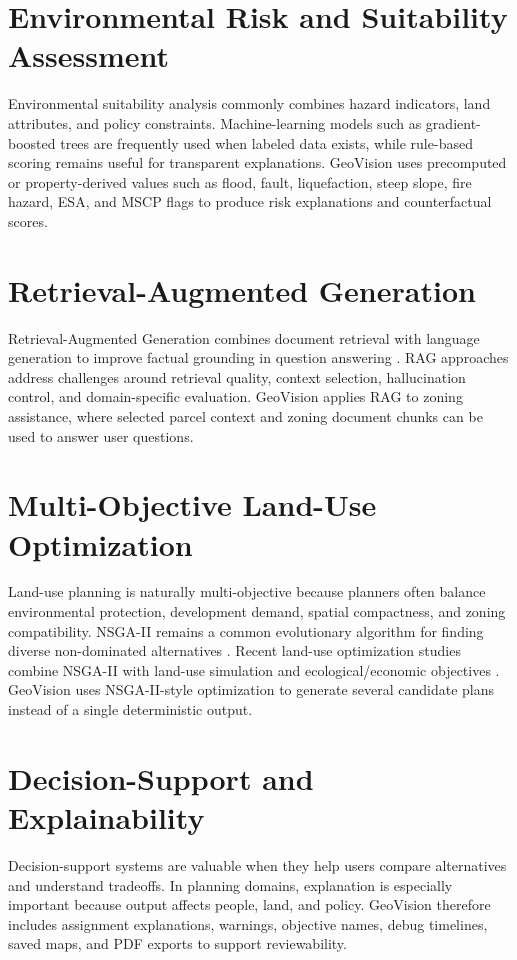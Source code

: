 \documentclass[12pt,a4paper,oneside]{report}
\begin{document}
\section{Environmental Risk and Suitability Assessment}
Environmental suitability analysis commonly combines hazard indicators, land attributes, and policy constraints. Machine-learning models such as gradient-boosted trees are frequently used when labeled data exists, while rule-based scoring remains useful for transparent explanations. GeoVision uses precomputed or property-derived values such as flood, fault, liquefaction, steep slope, fire hazard, ESA, and MSCP flags to produce risk explanations and counterfactual scores.

\section{Retrieval-Augmented Generation}
Retrieval-Augmented Generation combines document retrieval with language generation to improve factual grounding in question answering \cite{lewis2020rag}. RAG approaches address challenges around retrieval quality, context selection, hallucination control, and domain-specific evaluation. GeoVision applies RAG to zoning assistance, where selected parcel context and zoning document chunks can be used to answer user questions.

\section{Multi-Objective Land-Use Optimization}
Land-use planning is naturally multi-objective because planners often balance environmental protection, development demand, spatial compactness, and zoning compatibility. NSGA-II remains a common evolutionary algorithm for finding diverse non-dominated alternatives \cite{deb2002nsga}. Recent land-use optimization studies combine NSGA-II with land-use simulation and ecological/economic objectives \cite{luan2024landuse}. GeoVision uses NSGA-II-style optimization to generate several candidate plans instead of a single deterministic output.

\section{Decision-Support and Explainability}
Decision-support systems are valuable when they help users compare alternatives and understand tradeoffs. In planning domains, explanation is especially important because output affects people, land, and policy. GeoVision therefore includes assignment explanations, warnings, objective names, debug timelines, saved maps, and PDF exports to support reviewability.
\end{document}
